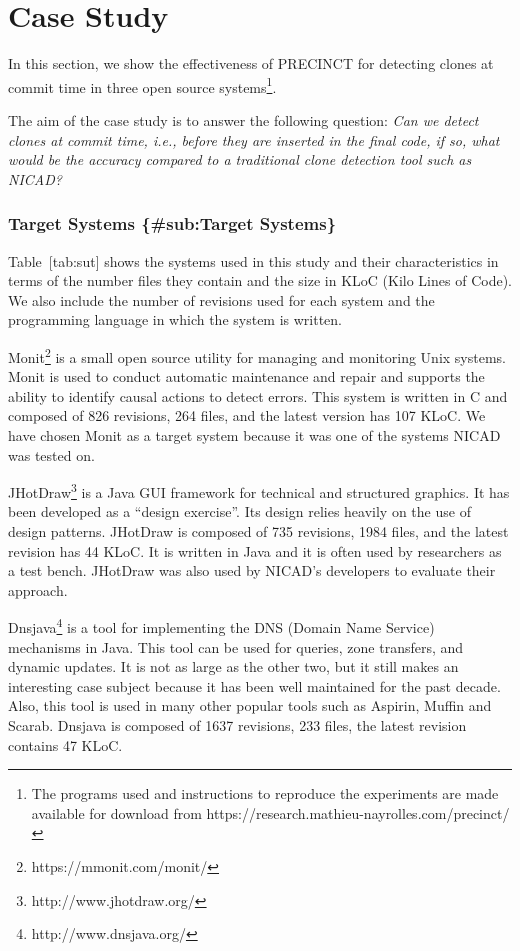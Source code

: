 \section{Case Study}\label{sec:Experimentations}

In this section, we show the effectiveness of PRECINCT for detecting
clones at commit time in three open source systems\footnote{The programs
  used and instructions to reproduce the experiments are made available
  for download from https://research.mathieu-nayrolles.com/precinct/}.

The aim of the case study is to answer the following question: \emph{Can
we detect clones at commit time, i.e., before they are inserted in the
final code, if so, what would be the accuracy compared to a traditional
clone detection tool such as NICAD?}

\subsubsection{Target Systems \{\#sub:Target
Systems\}}\label{target-systems-subtarget-systems}

Table~{[}tab:sut{]} shows the systems used in this study and their
characteristics in terms of the number files they contain and the size
in KLoC (Kilo Lines of Code). We also include the number of revisions
used for each system and the programming language in which the system is
written.

Monit\footnote{https://mmonit.com/monit/} is a small open source utility
for managing and monitoring Unix systems. Monit is used to conduct
automatic maintenance and repair and supports the ability to identify
causal actions to detect errors. This system is written in C and
composed of 826 revisions, 264 files, and the latest version has 107
KLoC. We have chosen Monit as a target system because it was one of the
systems NICAD was tested on.

JHotDraw\footnote{http://www.jhotdraw.org/} is a Java GUI framework for
technical and structured graphics. It has been developed as a ``design
exercise''. Its design relies heavily on the use of design patterns.
JHotDraw is composed of 735 revisions, 1984 files, and the latest
revision has 44 KLoC. It is written in Java and it is often used by
researchers as a test bench. JHotDraw was also used by NICAD's
developers to evaluate their approach.

Dnsjava\footnote{http://www.dnsjava.org/} is a tool for implementing the
DNS (Domain Name Service) mechanisms in Java. This tool can be used for
queries, zone transfers, and dynamic updates. It is not as large as the
other two, but it still makes an interesting case subject because it has
been well maintained for the past decade. Also, this tool is used in
many other popular tools such as Aspirin, Muffin and Scarab. Dnsjava is
composed of 1637 revisions, 233 files, the latest revision contains 47
KLoC.

